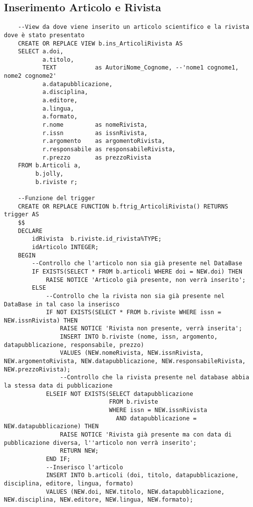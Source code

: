 \subsection{Inserimento Articolo e Rivista}
\begin{lstlisting}
    --View da dove viene inserito un articolo scientifico e la rivista dove è stato presentato
    CREATE OR REPLACE VIEW b.ins_ArticoliRivista AS
    SELECT a.doi,
           a.titolo,
           TEXT           as AutoriNome_Cognome, --'nome1 cognome1, nome2 cognome2'
           a.datapubblicazione,
           a.disciplina,
           a.editore,
           a.lingua,
           a.formato,
           r.nome         as nomeRivista,
           r.issn         as issnRivista,
           r.argomento    as argomentoRivista,
           r.responsabile as responsabileRivista,
           r.prezzo       as prezzoRivista
    FROM b.Articoli a,
         b.jolly,
         b.riviste r;
    
    --Funzione del trigger
    CREATE OR REPLACE FUNCTION b.ftrig_ArticoliRivista() RETURNS trigger AS
    $$
    DECLARE
        idRivista  b.riviste.id_rivista%TYPE;
        idArticolo INTEGER;
    BEGIN
        --Controllo che l'articolo non sia già presente nel DataBase
        IF EXISTS(SELECT * FROM b.articoli WHERE doi = NEW.doi) THEN
            RAISE NOTICE 'Articolo già presente, non verrà inserito';
        ELSE
            --Controllo che la rivista non sia già presente nel DataBase in tal caso la inserisco
            IF NOT EXISTS(SELECT * FROM b.riviste WHERE issn = NEW.issnRivista) THEN
                RAISE NOTICE 'Rivista non presente, verrà inserita';
                INSERT INTO b.riviste (nome, issn, argomento, datapubblicazione, responsabile, prezzo)
                VALUES (NEW.nomeRivista, NEW.issnRivista, NEW.argomentoRivista, NEW.datapubblicazione, NEW.responsabileRivista, NEW.prezzoRivista);
                --Controllo che la rivista presente nel database abbia la stessa data di pubblicazione
            ELSEIF NOT EXISTS(SELECT datapubblicazione
                              FROM b.riviste
                              WHERE issn = NEW.issnRivista
                                AND datapubblicazione = NEW.datapubblicazione) THEN
                RAISE NOTICE 'Rivista già presente ma con data di pubblicazione diversa, l''articolo non verrà inserito';
                RETURN NEW;
            END IF;
            --Inserisco l'articolo
            INSERT INTO b.articoli (doi, titolo, datapubblicazione, disciplina, editore, lingua, formato)
            VALUES (NEW.doi, NEW.titolo, NEW.datapubblicazione, NEW.disciplina, NEW.editore, NEW.lingua, NEW.formato);
    

\end{lstlisting}
